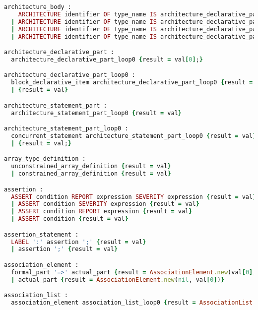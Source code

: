 \begin{lstlisting}[language=Ruby, style=rubystyle]
architecture_body :
    ARCHITECTURE identifier OF type_name IS architecture_declarative_part BEGIN architecture_statement_part END ARCHITECTURE identifier ';' {InitializeRepository.add(val[1]); result = ArchitectureDeclaration.new(val[1], val[3], val[5], val[7],val[9...val.length-1]);}
  | ARCHITECTURE identifier OF type_name IS architecture_declarative_part BEGIN architecture_statement_part END identifier ';' {InitializeRepository.add(val[1]); result = ArchitectureDeclaration.new(val[1], val[3], val[5], val[7],val[9...val.length-1]); }
  | ARCHITECTURE identifier OF type_name IS architecture_declarative_part BEGIN architecture_statement_part END ARCHITECTURE ';' {InitializeRepository.add(val[1]);result = ArchitectureDeclaration.new(val[1], val[3], val[5], val[7],val[9...val.length-1]);}
  | ARCHITECTURE identifier OF type_name IS architecture_declarative_part BEGIN architecture_statement_part END ';' {InitializeRepository.add(val[1]);result = ArchitectureDeclaration.new(val[1], val[3], val[5], val[7],val[9...val.length-1]);}

architecture_declarative_part :
  architecture_declarative_part_loop0 {result = val[0];}

architecture_declarative_part_loop0 :
  block_declarative_item architecture_declarative_part_loop0 {result = val.flatten.compact;}
  | {result = val}

architecture_statement_part :
  architecture_statement_part_loop0 {result = val}

architecture_statement_part_loop0 :
  concurrent_statement architecture_statement_part_loop0 {result = val}
  | {result = val;}

array_type_definition :
  unconstrained_array_definition {result = val}
  | constrained_array_definition {result = val}

assertion :
  ASSERT condition REPORT expression SEVERITY expression {result = val}
  | ASSERT condition SEVERITY expression {result = val}
  | ASSERT condition REPORT expression {result = val}
  | ASSERT condition {result = val}

assertion_statement :
  LABEL ':' assertion ';' {result = val}
  | assertion ';' {result = val}

association_element :
  formal_part '=>' actual_part {result = AssociationElement.new(val[0], val[2]);}
  | actual_part {result = AssociationElement.new(nil, val[0])}

association_list :
  association_element association_list_loop0 {result = AssociationList.new(val.flatten)}


\end{lstlisting}
